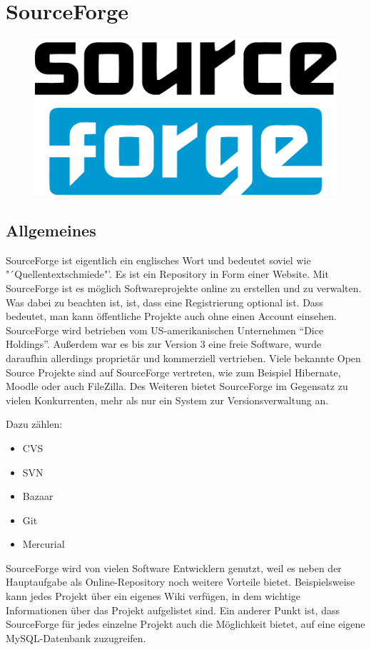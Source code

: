 


\section{SourceForge}

\begin{figure}[h]
\centering
\includegraphics[width=0.5\linewidth]{sourceforge-logo}
\end{figure}

\subsection{Allgemeines}

SourceForge ist eigentlich ein englisches Wort und bedeutet soviel wie "´Quellentextschmiede"'. Es ist ein Repository in Form einer Website. Mit SourceForge ist es m\"oglich Softwareprojekte online zu erstellen und zu verwalten. Was dabei zu beachten ist, ist, dass eine Registrierung optional ist. Dass bedeutet, man kann \"offentliche Projekte auch ohne einen Account einsehen. SourceForge wird betrieben vom US-amerikanischen Unternehmen "`Dice Holdings"'. Au{\ss}erdem war es bis zur Version 3 eine freie Software, wurde daraufhin allerdings propriet\"ar und kommerziell vertrieben. Viele bekannte Open Source Projekte sind auf SourceForge vertreten, wie zum Beispiel Hibernate, Moodle oder auch FileZilla. Des Weiteren bietet SourceForge im Gegensatz zu vielen Konkurrenten, mehr als nur ein System zur Versionsverwaltung an. 

Dazu z\"ahlen: 
\begin{itemize}
	\item CVS
	\item SVN
	\item Bazaar
	\item Git
	\item Mercurial
\end{itemize}

SourceForge wird von vielen Software Entwicklern genutzt, weil es neben der Hauptaufgabe als Online-Repository noch weitere Vorteile bietet. Beispielsweise kann jedes Projekt \"uber ein eigenes Wiki verf\"ugen, in dem wichtige Informationen \"uber das Projekt aufgelistet sind. Ein anderer Punkt ist, dass SourceForge f\"ur jedes einzelne Projekt auch die M\"oglichkeit bietet, auf eine eigene MySQL-Datenbank zuzugreifen.


